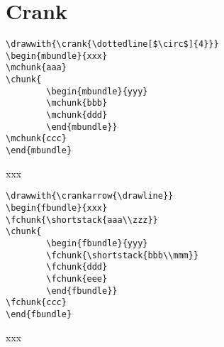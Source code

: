 \section{Crank}

\begin{minipage}{0.6\textwidth}
\begin{verbatim}
\drawwith{\crank{\dottedline[$\circ$]{4}}}
\begin{mbundle}{xxx}
\mchunk{aaa}
\chunk{
        \begin{mbundle}{yyy}
        \mchunk{bbb}
        \mchunk{ddd}
        \end{mbundle}}
\mchunk{ccc}
\end{mbundle}
\end{verbatim}
\end{minipage}\begin{minipage}{0.4\textwidth}
\begin{mbundle}{xxx}
\end{mbundle}
\end{minipage}

\vspace{1cm}

\noindent\begin{minipage}{0.6\textwidth}
\begin{verbatim}
\drawwith{\crankarrow{\drawline}}
\begin{fbundle}{xxx}
\fchunk{\shortstack{aaa\\zzz}}
\chunk{
        \begin{fbundle}{yyy}
        \fchunk{\shortstack{bbb\\mmm}}
        \fchunk{ddd}
        \fchunk{eee}
        \end{fbundle}}
\fchunk{ccc}
\end{fbundle}
\end{verbatim}
\end{minipage}\begin{minipage}{0.4\textwidth}
\drawwith{\crankarrow{\drawline}}
\begin{fbundle}{xxx}
\end{fbundle}
\end{minipage}

